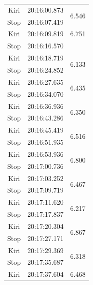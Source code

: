 \begin{longtable}{|c|c|c|}
  Kiri           & 20:16:00.873        & \multirow{2}{*}{6.546}  \\ \cline{1-2}
  Stop           & 20:16:07.419        &                         \\ \hline
  Kiri           & 20:16:09.819        & 6.751  \\ \hline
  Stop           & 20:16:16.570        &                         \\ \hline
  Kiri           & 20:16:18.719        & \multirow{2}{*}{6.133}  \\ \cline{1-2}
  Stop           & 20:16:24.852        &                         \\ \hline
  Kiri           & 20:16:27.635        & \multirow{2}{*}{6.435}  \\ \cline{1-2}
  Stop           & 20:16:34.070        &                         \\ \hline
  Kiri           & 20:16:36.936        & \multirow{2}{*}{6.350}  \\ \cline{1-2}
  Stop           & 20:16:43.286        &                         \\ \hline
  Kiri           & 20:16:45.419        & \multirow{2}{*}{6.516}  \\ \cline{1-2}
  Stop           & 20:16:51.935        &                         \\ \hline
  Kiri           & 20:16:53.936        & \multirow{2}{*}{6.800}  \\ \cline{1-2}
  Stop           & 20:17:00.736        &                         \\ \hline
  Kiri           & 20:17:03.252        & \multirow{2}{*}{6.467}  \\ \cline{1-2}
  Stop           & 20:17:09.719        &                         \\ \hline
  Kiri           & 20:17:11.620        & \multirow{2}{*}{6.217}  \\ \cline{1-2}
  Stop           & 20:17:17.837        &                         \\ \hline
  Kiri           & 20:17:20.304        & \multirow{2}{*}{6.867}  \\ \cline{1-2}
  Stop           & 20:17:27.171        &                         \\ \hline
  Kiri           & 20:17:29.369        & \multirow{2}{*}{6.318}  \\ \cline{1-2}
  Stop           & 20:17:35.687        &                         \\ \hline
  Kiri           & 20:17:37.604        & \multirow{2}{*}{6.468}  \\ \cline{1-2}

\end{longtable}
